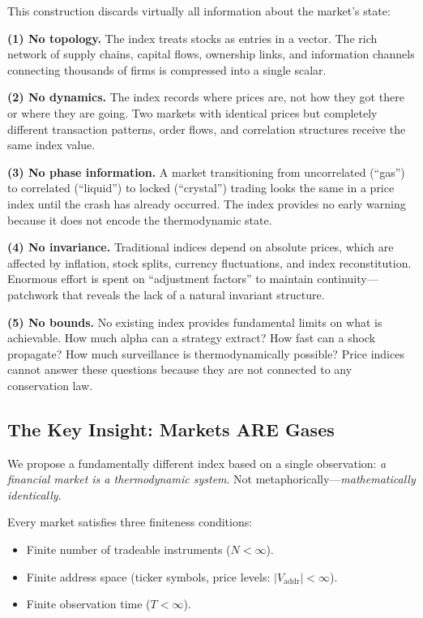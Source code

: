 \documentclass[twocolumn,10pt]{article}
\theoremstyle{remark}
\newcommand{\Vaddr}{V_{\mathrm{addr}}}
\begin{document}
This construction discards virtually all information about the market's state:

\textbf{(1) No topology.}  The index treats stocks as entries in a vector.  The rich network of supply chains, capital flows, ownership links, and information channels connecting thousands of firms is compressed into a single scalar.

\textbf{(2) No dynamics.}  The index records where prices are, not how they got there or where they are going.  Two markets with identical prices but completely different transaction patterns, order flows, and correlation structures receive the same index value.

\textbf{(3) No phase information.}  A market transitioning from uncorrelated (``gas'') to correlated (``liquid'') to locked (``crystal'') trading looks the same in a price index until the crash has already occurred.  The index provides no early warning because it does not encode the thermodynamic state.

\textbf{(4) No invariance.}  Traditional indices depend on absolute prices, which are affected by inflation, stock splits, currency fluctuations, and index reconstitution.  Enormous effort is spent on ``adjustment factors'' to maintain continuity---patchwork that reveals the lack of a natural invariant structure.

\textbf{(5) No bounds.}  No existing index provides fundamental limits on what is achievable.  How much alpha can a strategy extract?  How fast can a shock propagate?  How much surveillance is thermodynamically possible?  Price indices cannot answer these questions because they are not connected to any conservation law.

\subsection{The Key Insight: Markets ARE Gases}

We propose a fundamentally different index based on a single observation: \emph{a financial market is a thermodynamic system}.  Not metaphorically---\emph{mathematically identically}.

Every market satisfies three finiteness conditions:
\begin{itemize}
    \item Finite number of tradeable instruments ($N < \infty$).
    \item Finite address space (ticker symbols, price levels: $|\Vaddr| < \infty$).
    \item Finite observation time ($T < \infty$).
\end{itemize}
\end{document}
